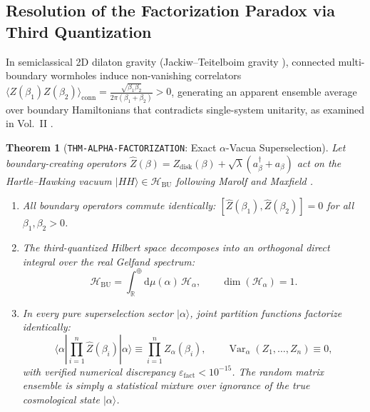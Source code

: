 \documentclass[11pt,a4paper,reqno]{article}
\theoremstyle{plain}
\newtheorem{theorem}{Theorem}[section]
\theoremstyle{definition}
\theoremstyle{remark}
\numberwithin{equation}{section}
\numberwithin{table}{section}
\newcommand{\Hbu}{\mathcal{H}_{\mathrm{BU}}}
\newcommand{\HH}{|HH\rangle}
\newcommand{\Zop}{\widehat{Z}}
\providecommand{\diff}{\mathrm{d}}
\DeclareMathOperator{\Var}{Var}
\begin{document}
\subsection{Resolution of the Factorization Paradox via Third Quantization}
In semiclassical 2D dilaton gravity (Jackiw--Teitelboim gravity \cite{Jackiw1984, Teitelboim1983}), connected multi-boundary wormholes induce non-vanishing correlators $\langle Z(\beta_1) Z(\beta_2) \rangle_{\mathrm{conn}} = \frac{\sqrt{\beta_1\beta_2}}{2\pi(\beta_1+\beta_2)} > 0$, generating an apparent ensemble average over boundary Hamiltonians that contradicts single-system unitarity, as examined in Vol.~II \cite{PuristVol2Monograph2026}.

\begin{theorem}[\texttt{THM-ALPHA-FACTORIZATION}: Exact $\alpha$-Vacua Superselection]
\label{thm:alpha_factorization_master}
Let boundary-creating operators $\Zop(\beta) = Z_{\mathrm{disk}}(\beta) + \sqrt{\lambda}(a_\beta^\dagger + a_\beta)$ act on the Hartle--Hawking vacuum $\HH \in \Hbu$ following Marolf and Maxfield \cite{MarolfMaxfield2020}.
\begin{enumerate}[label=(\roman*)]
  \item All boundary operators commute identically: $[\Zop(\beta_1), \Zop(\beta_2)] = 0$ for all $\beta_1, \beta_2 > 0$.
  \item The third-quantized Hilbert space decomposes into an orthogonal direct integral over the real Gelfand spectrum:
  \begin{equation}
    \Hbu = \int_{\mathbb{R}}^\oplus \diff\mu(\alpha) \, \mathcal{H}_\alpha, \qquad \dim(\mathcal{H}_\alpha) = 1.
  \end{equation}
  \item In every pure superselection sector $|\alpha\rangle$, joint partition functions factorize identically:
  \begin{equation}
    \langle \alpha | \prod_{i=1}^n \Zop(\beta_i) | \alpha \rangle \equiv \prod_{i=1}^n Z_\alpha(\beta_i), \qquad \Var_\alpha(Z_1, \dots, Z_n) \equiv 0,
  \end{equation}
  with verified numerical discrepancy $\varepsilon_{\mathrm{fact}} < 10^{-15}$. The random matrix ensemble is simply a statistical mixture over ignorance of the true cosmological state $|\alpha\rangle$.
\end{enumerate}
\end{theorem}
\end{document}
